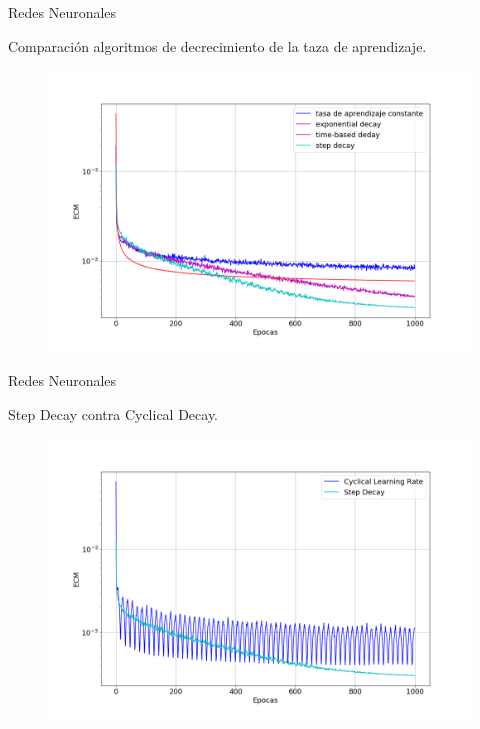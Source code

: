 \documentclass{beamer}
\begin{document}
\begin{frame}{Redes Neuronales}

    Comparaci\'on algoritmos de decrecimiento de la taza de aprendizaje. 
    

    \begin{figure}[!tbp]
        \includegraphics[scale=0.28]{comparacion_post}
    \end{figure}


\end{frame}

\begin{frame}{Redes Neuronales}

Step Decay contra Cyclical Decay.

    \begin{figure}[!tbp]
        \includegraphics[scale=0.28]{step_vs_cyclical}
    \end{figure}

\end{frame}
\end{document}
